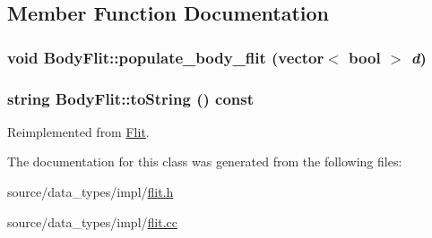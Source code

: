 \subsection{Member Function Documentation}
\hypertarget{classBodyFlit_52eb491a5ee62a1f8f9ffc71d955da94}{
\subsubsection[{populate\_\-body\_\-flit}]{\setlength{\rightskip}{0pt plus 5cm}void BodyFlit::populate\_\-body\_\-flit (vector$<$ bool $>$ {\em d})}}
\label{classBodyFlit_52eb491a5ee62a1f8f9ffc71d955da94}


\hypertarget{classBodyFlit_408f02aae1a229c761ff0f3537675cde}{
\subsubsection[{toString}]{\setlength{\rightskip}{0pt plus 5cm}string BodyFlit::toString () const}}
\label{classBodyFlit_408f02aae1a229c761ff0f3537675cde}




Reimplemented from \hyperlink{classFlit_ffc6c729a005389b51818aac59710dab}{Flit}.

The documentation for this class was generated from the following files:\begin{CompactItemize}
\item 
source/data\_\-types/impl/\hyperlink{flit_8h}{flit.h}\item 
source/data\_\-types/impl/\hyperlink{flit_8cc}{flit.cc}\end{CompactItemize}
